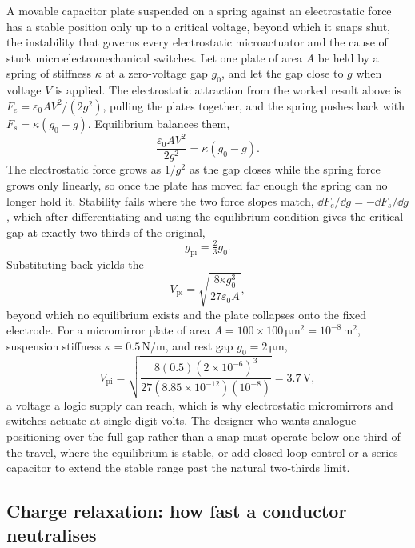 A movable capacitor plate suspended on a spring against an electrostatic
force has a stable position only up to a critical voltage, beyond which it
snaps shut, the instability that governs every electrostatic
microactuator and the cause of stuck microelectromechanical switches. Let
one plate of area $A$ be held by a spring of stiffness $\kappa$ at a
zero-voltage gap $g_0$, and let the gap close to $g$ when voltage $V$ is
applied. The electrostatic attraction from the worked result above is
$F_e = \varepsilon_0 A V^{2}/(2g^{2})$, pulling the plates together, and
the spring pushes back with $F_s = \kappa(g_0 - g)$. Equilibrium balances
them,
\[
\frac{\varepsilon_0 A V^{2}}{2g^{2}} = \kappa(g_0 - g).
\]
The electrostatic force grows as $1/g^{2}$ as the gap closes while the
spring force grows only linearly, so once the plate has moved far enough
the spring can no longer hold it. Stability fails where the two force
slopes match, $\dd F_e/\dd g = -\dd F_s/\dd g$, which after
differentiating and using the equilibrium condition gives the critical
gap at exactly two-thirds of the original,
\[
g_{\text{pi}} = \tfrac{2}{3}g_0.
\]
Substituting back yields the 
\[
V_{\text{pi}} = \sqrt{\frac{8\kappa g_0^{3}}{27\varepsilon_0 A}},
\]
beyond which no equilibrium exists and the plate collapses onto the fixed
electrode. For a micromirror plate of area $A = 100\times 100\,\si{\micro\meter\squared}
= 10^{-8}\,\si{\meter\squared}$, suspension stiffness
$\kappa = 0.5\,\si{\newton\per\meter}$, and rest gap $g_0 = 2\,\si{\micro
\meter}$,
\[
V_{\text{pi}} = \sqrt{\frac{8(0.5)(2\times 10^{-6})^{3}}{27(8.85\times
10^{-12})(10^{-8})}} = 3.7\,\si{\volt},
\]
a voltage a logic supply can reach, which is why electrostatic
micromirrors and switches actuate at single-digit volts. The designer who
wants analogue positioning over the full gap rather than a snap must
operate below one-third of the travel, where the equilibrium is stable, or
add closed-loop control or a series capacitor to extend the stable range
past the natural two-thirds limit.

\subsection{Charge relaxation: how fast a conductor neutralises}

